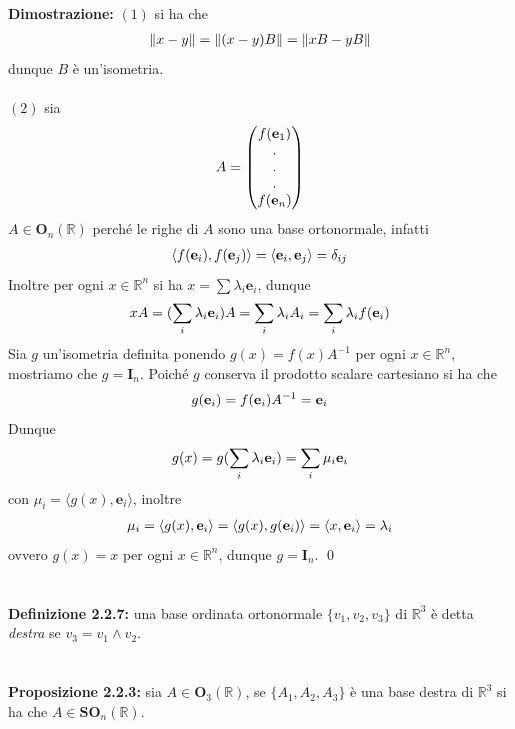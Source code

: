\documentclass{article}
\begin{document}
\textbf{Dimostrazione:} $(1)$ si ha che
\begin{gather}
    \| x - y \| = \| (x - y)B \| = \| xB - yB \| \notag
\end{gather}
dunque $B$ è un'isometria. \\ \\
$(2)$ sia
\begin{gather}
    A = \begin{pmatrix}
        f(\mathbf{e}_1) \\
        . \\
        . \\
        . \\
        f(\mathbf{e}_n)
    \end{pmatrix} \notag
\end{gather}
$A \in \mathbf{O}_n(\mathbb{R})$ perché le righe di $A$ sono una base ortonormale, infatti
\begin{gather}
    \langle f(\mathbf{e}_i), f(\mathbf{e}_j) \rangle = \langle \mathbf{e}_i, \mathbf{e}_j \rangle = \delta_{ij} \notag
\end{gather}
Inoltre per ogni $x \in \mathbb{R}^n$ si ha $x = \sum \lambda_i \mathbf{e}_i$, dunque
\begin{gather}
    xA = (\sum_i \lambda_i \mathbf{e}_i)A = \sum_i \lambda_i A_i = \sum_i \lambda_i f(\mathbf{e}_i) \notag
\end{gather}
Sia $g$ un'isometria definita ponendo $g(x) = f(x)A^{-1}$ per ogni $x \in \mathbb{R}^n$, mostriamo che $g = \mathbf{I}_n$. Poiché $g$ conserva il prodotto scalare cartesiano si ha che
\begin{gather}
    g(\mathbf{e}_i) = f(\mathbf{e}_i)A^{-1} = \mathbf{e}_i \notag
\end{gather}
Dunque
\begin{gather}
    g(x) = g(\sum_i \lambda_i \mathbf{e}_i) = \sum_i \mu_i \mathbf{e}_i \notag
\end{gather}
con $\mu_i = \langle g(x), \mathbf{e}_i \rangle$, inoltre
\begin{gather}
    \mu_i = \langle g(x), \mathbf{e}_i \rangle = \langle g(x), g(\mathbf{e}_i) \rangle = \langle x, \mathbf{e}_i \rangle = \lambda_i \notag 
\end{gather}
ovvero $g(x) = x$ per ogni $x \in \mathbb{R}^n$, dunque $g = \mathbf{I}_n$. \qed \\ \\ \\
\textbf{Definizione 2.2.7:} una base ordinata ortonormale $\{ v_1, v_2, v_3 \}$ di $\mathbb{R}^3$ è detta \textit{destra} se $v_3 = v_1 \wedge v_2$. \\ \\ \\
\textbf{Proposizione 2.2.3:} sia $A \in \mathbf{O}_3(\mathbb{R})$, se $\{ A_1, A_2, A_3 \}$ è una base destra di $\mathbb{R}^3$ si ha che $A \in \mathbf{SO}_n(\mathbb{R})$. \\
\end{document}
